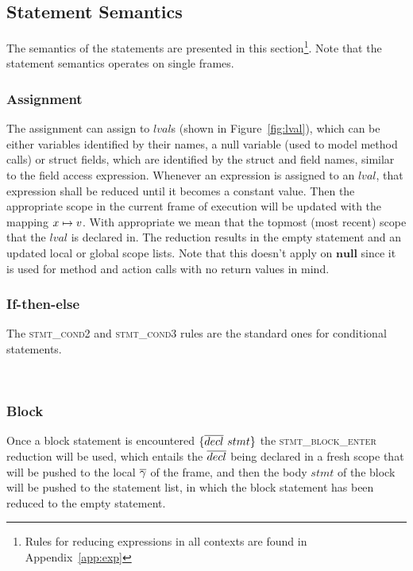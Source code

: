 \documentclass[UTF8]{article}
\begin{document}
\subsection{Statement Semantics}
The semantics of the statements are presented in this section\footnote{Rules for reducing expressions in all contexts are found in Appendix~\ref{app:exp}}. Note that the statement semantics operates on single frames.


\subsubsection*{Assignment}
The assignment can assign to $lval$s (shown in Figure~\ref{fig:lval}), which can be either variables identified by their names, a null variable (used to model method calls) or struct fields, which are identified by the struct and field names, similar to the field access expression. Whenever an expression is assigned to an $lval$, that expression shall be reduced until it becomes a constant value. Then the appropriate scope in the current frame of execution will be updated with the mapping  $x \mapsto v$. With appropriate we mean that the topmost (most recent) scope that the $lval$ is declared in. The reduction results in the empty statement and an updated local or global scope lists. Note that this doesn't apply on $\mathbf{null}$ since it is used for method and action calls with no return values in mind.

\begin{figure}[ht!]
    \ottusedrule{\ottdrulestmtXXassXXv{}}
\end{figure}

\subsubsection*{If-then-else}
The \textsc{stmt\_cond2} and \textsc{stmt\_cond3} rules are the standard ones for conditional statements.

\begin{figure}[ht!]
    \ottusedrule{\ottdrulestmtXXcondTwo{}} \\
    \ottusedrule{\ottdrulestmtXXcondThree{}} 
\end{figure}


\subsubsection*{Block}
Once a block statement is encountered $ \{ \overline{decl} \ stmt \}$ the \textsc{stmt\_block\_enter} reduction will be used, which entails the $\overline{decl}{}$ being declared in a fresh scope that will be pushed to the local $\overline{\gamma}{}$ of the frame, and then the body $stmt$ of the block will be pushed to the statement list, in which the block statement has been reduced to the empty statement.
\end{document}
